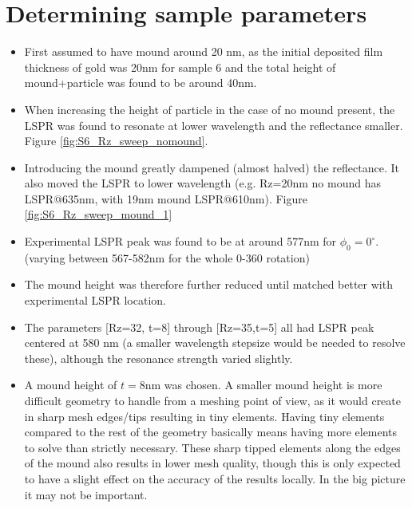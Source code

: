 \section{Determining sample parameters}
\label{appendix:sample_parameters}
\begin{itemize}
    \item First assumed to have mound around 20 nm, as the initial deposited film thickness of gold was 20nm for sample 6 and the total height of mound+particle was found to be around 40nm.
    \item When increasing the height of particle in the case of no mound present, the LSPR was found to resonate at lower wavelength and the reflectance smaller. Figure \ref{fig:S6_Rz_sweep_nomound}.
    \item Introducing the mound greatly dampened (almost halved) the reflectance. It also moved the LSPR to lower wavelength (e.g. Rz=20nm no mound has LSPR@635nm, with 19nm mound LSPR@610nm). Figure \ref{fig:S6_Rz_sweep_mound_1}
    \item Experimental LSPR peak was found to be at around 577nm for $\phi_0=0^\circ$. (varying between 567-582nm for the whole 0-360 rotation)
    \item The mound height was therefore further reduced until matched better with experimental LSPR location.
    \item The parameters [Rz=32, t=8] through [Rz=35,t=5] all had LSPR peak centered at 580 nm (a smaller wavelength stepsize would be needed to resolve these), although the resonance strength varied slightly.
    \item A mound height of $t=8$nm was chosen. A smaller mound height is more difficult geometry to handle from a meshing point of view, as it would create in sharp mesh edges/tips resulting in tiny elements. Having tiny elements compared to the rest of the geometry basically means having more elements to solve than strictly necessary. These sharp tipped elements along the edges of the mound also results in lower mesh quality, though this is only expected to have a slight effect on the accuracy of the results locally. In the big picture it may not be important.
\end{itemize}

